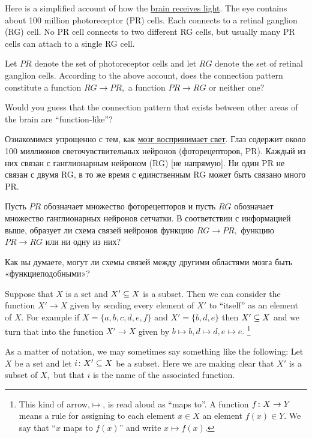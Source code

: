 \documentclass[CT4S-EN-RU]{subfiles}
\begin{document}
\begin{exerciseENG}
Here is a simplified account of how the \href{http://en.wikipedia.org/wiki/Retina}{\text brain receives light}. The eye contains about 100 million photoreceptor (PR) cells. Each connects to a retinal ganglion (RG) cell. No PR cell connects to two different RG cells, but usually many PR cells can attach to a single RG cell. 

Let $PR$ denote the set of photoreceptor cells and let $RG$ denote the set of retinal ganglion cells. 
\sexc According to the above account, does the connection pattern constitute a function $RG\to PR,$ a function $PR\to RG$ or neither one? 
\item Would you guess that the connection pattern that exists between other areas of the brain are “function-like”?
\endsexc
\end{exerciseENG}

\begin{exerciseRUS}
Ознакомимся упрощенно с тем, как \href{https://ru.wikipedia.org/wiki/%D0%A1%D0%B5%D1%82%D1%87%D0%B0%D1%82%D0%BA%D0%B0}{\text мозг воспринимает свет}. Глаз содержит около 100 миллионов светочувствительных нейронов (фоторецепторов, PR). Каждый из них связан с ганглионарным нейроном (RG) [не напрямую]. Ни один PR не связан с двумя RG, в то же время с единственным RG может быть связано много PR.

Пусть $PR$ обозначает множество фоторецепторов и пусть $RG$ обозначает множество ганглионарных нейронов сетчатки. 
\sexc В соответствии с информацией выше, образует ли схема связей нейронов функцию $RG\to PR,$ функцию $PR\to RG$ или ни одну из них? 
\item Как вы думаете, могут ли схемы связей между другими областями мозга быть «функциеподобными»? 
\endsexc 
\end{exerciseRUS}

\begin{exampleENG}\label{ex:subset as function}
Suppose that $X$ is a set and $X'\ss X$ is a subset. Then we can consider the function $X'\to X$ given by sending every element of $X'$ to “itself” as an element of $X.$ For example if $X=\{a,b,c,d,e,f\}$ and $X'=\{b,d,e\}$ then $X'\ss X$ and we turn that into the function $X'\to X$ given by $b\mapsto b, d\mapsto d, e\mapsto e.$%
\footnote{This kind of arrow,\;\;$\mapsto$\;\;, is read aloud as “maps to”. A function $f\taking X\to Y$ means a rule for assigning to each element $x\in X$ an element $f(x)\in Y.$ We say that “$x$ maps to $f(x)$” and write $x\mapsto f(x).$}

As a matter of notation, we may sometimes say something like the following: Let $X$ be a set and let $i\taking X'\ss X$ be a subset. Here we are making clear that $X'$ is a subset of $X,$ but that $i$ is the name of the associated function.
\end{exampleENG}
\end{document}
